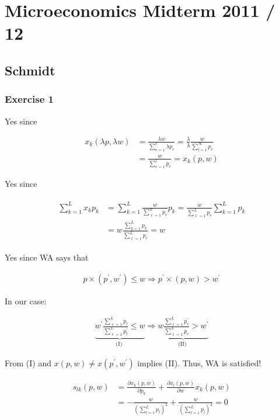 \section*{Microeconomics Midterm 2011 / 12}

{
\subsection*{Schmidt}

\subsubsection*{Exercise 1}

\begin{enumerate}[label=(\alph*)]
{\item 
Yes since

\begin{align*}
    x_k(\lambda p, \lambda w) & =\frac{\lambda w}{\sum_{e=1}^c \lambda p_e}=\frac{\lambda}{\lambda} \frac{w}{\sum_{l=1}^{\infty} p_e} \\
    & =\frac{w}{\sum_{e=1}^l p_e}=x_k(p, w)
\end{align*}
}
{\item 
Yes since

\begin{align*}
\begin{aligned}
    \sum_{k=1}^L x_k p_k & =\sum_{k=1}^L \frac{w}{\sum_{\ell=1}^w p_e} p_k=\frac{w}{\sum_{\ell=1}^L p_e} \sum_{k=1}^L p_k \\
    & =w \frac{\sum_{k=1}^L p_k}{\sum_{\ell=1}^L p_e}=w
\end{aligned}
\end{align*}
}
{\item 
Yes since WA says that

\begin{align*}
    p \times\left(p^{\prime}, w^{\prime}\right) \leqslant w \Longrightarrow p^{\prime} \times(p, w)>w^{\prime}
\end{align*}

In our case:

\begin{align*}
    \underbrace{w^{\prime} \frac{\sum_{\ell=1}^L p_l}{\sum_{\ell=1}^L p_l^{\prime}} \leqslant w}_{\text {(I) }} \Rightarrow \underbrace{w \frac{\sum_{\ell=1}^L p_e^{\prime}}{\sum_{\ell=1}^L p_e}>w^{\prime}}_{\text {(II) }}
\end{align*}

From (I) and $x(p, w) \neq x\left(p^{\prime}, w^{\prime}\right)$ implies (II). Thus, WA is satisfied!
}
{\item 
\begin{align*}
    s_{l k}(p, w) & =\frac{\partial x_k(p, w)}{\partial p_k}+\frac{\partial x_l(p, w)}{\partial w} x_k(p, w) \\
    & =-\frac{w}{\left(\sum_{l=1}^L p_l\right)^2}+\frac{w}{\left(\sum_{l=1}^L p_l\right)^2}=0
\end{align*}

}
\end{enumerate}}
